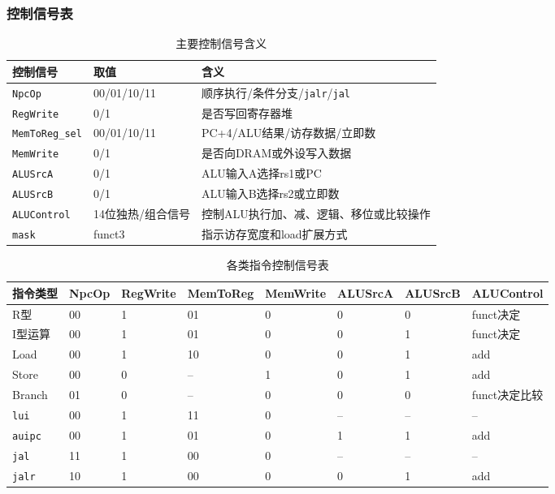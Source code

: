 \documentclass[UTF8,a4paper,12pt]{ctexart}
\newcommand{\code}[1]{\texttt{#1}}
\begin{document}
\subsubsection{控制信号表}

\begin{table}[H]
\centering
\caption{主要控制信号含义}
\begin{tabularx}{\textwidth}{p{3cm}p{3cm}X}
\toprule
控制信号 & 取值 & 含义 \\
\midrule
\code{NpcOp} & 00/01/10/11 & 顺序执行/条件分支/\code{jalr}/\code{jal} \\
\code{RegWrite} & 0/1 & 是否写回寄存器堆 \\
\code{MemToReg\_sel} & 00/01/10/11 & PC+4/ALU结果/访存数据/立即数 \\
\code{MemWrite} & 0/1 & 是否向DRAM或外设写入数据 \\
\code{ALUSrcA} & 0/1 & ALU输入A选择rs1或PC \\
\code{ALUSrcB} & 0/1 & ALU输入B选择rs2或立即数 \\
\code{ALUControl} & 14位独热/组合信号 & 控制ALU执行加、减、逻辑、移位或比较操作 \\
\code{mask} & funct3 & 指示访存宽度和load扩展方式 \\
\bottomrule
\end{tabularx}
\end{table}

\begin{table}[H]
\centering
\caption{各类指令控制信号表}
\scriptsize
\begin{tabularx}{\textwidth}{p{2cm}p{1.2cm}p{1.4cm}p{1.6cm}p{1.4cm}p{1.4cm}p{1.4cm}X}
\toprule
指令类型 & NpcOp & RegWrite & MemToReg & MemWrite & ALUSrcA & ALUSrcB & ALUControl \\
\midrule
R型 & 00 & 1 & 01 & 0 & 0 & 0 & funct决定 \\
I型运算 & 00 & 1 & 01 & 0 & 0 & 1 & funct决定 \\
Load & 00 & 1 & 10 & 0 & 0 & 1 & add \\
Store & 00 & 0 & -- & 1 & 0 & 1 & add \\
Branch & 01 & 0 & -- & 0 & 0 & 0 & funct决定比较 \\
\code{lui} & 00 & 1 & 11 & 0 & -- & -- & -- \\
\code{auipc} & 00 & 1 & 01 & 0 & 1 & 1 & add \\
\code{jal} & 11 & 1 & 00 & 0 & -- & -- & -- \\
\code{jalr} & 10 & 1 & 00 & 0 & 0 & 1 & add \\
\bottomrule
\end{tabularx}
\end{table}
\end{document}
